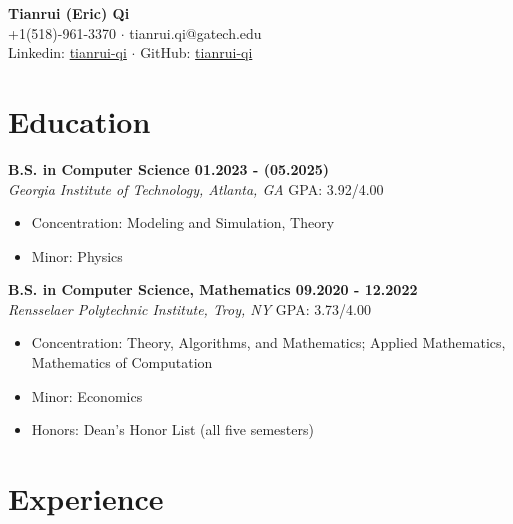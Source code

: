 \documentclass[letterpaper, 10pt]{article}
\newcommand{\subsectionvspace}{\vspace{6pt}}
\begin{document}
\begin{center}
    \textbf{\LARGE Tianrui (Eric) Qi} \\
    +1(518)-961-3370 
    $\cdot$ 
    tianrui.qi@gatech.edu \\ 
    Linkedin: \href{https://www.linkedin.com/in/tianrui-qi/}{tianrui-qi} 
    $\cdot$ 
    GitHub: \href{https://github.com/tianrui-qi}{tianrui-qi}
\end{center}


\section{Education}


    \textbf{B.S. in Computer Science \hfill 01.2023 - (05.2025)} \\
    \textit{Georgia Institute of Technology, Atlanta, GA} \hfill GPA: 3.92/4.00
    \begin{itemize}
        \item Concentration: Modeling and Simulation, Theory
        \item Minor: Physics
    \end{itemize}

    \subsectionvspace

    \textbf{B.S. in Computer Science, Mathematics \hfill 09.2020 - 12.2022} \\
    \textit{Rensselaer Polytechnic Institute, Troy, NY} \hfill GPA: 3.73/4.00 
    \begin{itemize}
        \item Concentration: Theory, Algorithms, and Mathematics; Applied Mathematics, Mathematics of Computation 
        \item Minor: Economics         
        \item Honors: Dean's Honor List (all five semesters)
    \end{itemize}


\section{Experience}
\end{document}
